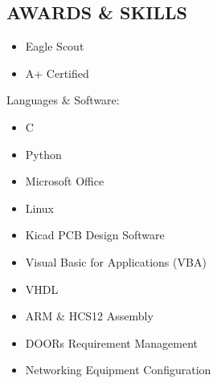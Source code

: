 \documentclass[line,margin]{res}
\begin{document}
\begin{resume}
\section{AWARDS \& SKILLS } 
		\begin{multicols}{2}
			\begin{itemize}
				\itemsep -2pt
				\item[] Eagle Scout
				\item[] A+ Certified
			\end{itemize}
		\end{multicols}
	\vspace{-10pt}
	{Languages \& Software:} %
		\begin{multicols}{2}
			\begin{itemize}
				\itemsep -2pt
				\item[] C
				\item[] Python
				\item[] Microsoft Office
				\item[] Linux
				\item[] Kicad PCB Design Software
				\item[] Visual Basic for Applications (VBA)
				\item[] VHDL
				\item[] ARM \& HCS12 Assembly
				\item[] DOORs Requirement Management
				\item[] Networking Equipment Configuration
			\end{itemize}
		\end{multicols}

\end{resume}
\end{document}
